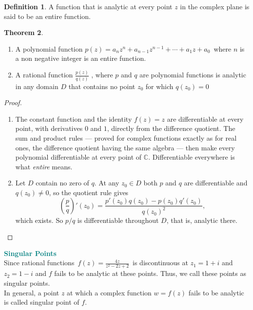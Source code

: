 \documentclass[11pt,a4paper]{article}
\theoremstyle{definition}
\newtheorem{thm}{Theorem}[section]
\newtheorem{definition}[thm]{Definition}
\begin{document}
\begin{definition}
A function that is analytic at every point $z$ in the complex plane is said to be an entire function.
\end{definition}

\begin{thm}
\begin{enumerate}
\item A polynomial function $p(z) = a_nz^n + a_{n - 1}z^{n - 1} + \cdots + a_1z + a_0\,$ where $n$ is a non negative integer is an entire function.
\item A rational function $\frac{p(z)}{q(z)}$ , where $p$ and $q$ are polynomial functions is analytic in any domain $D$ that contains no point $z_0$ for which $q(z_0) = 0$\\
\end{enumerate}

\begin{proof}
\begin{enumerate}
\item The constant function and the identity $f(z)=z$ are differentiable at
every point, with derivatives $0$ and $1$, directly from the difference
quotient. The sum and product rules --- proved for complex functions exactly as
for real ones, the difference quotient having the same algebra --- then make
every polynomial differentiable at every point of $\mathbb{C}$. Differentiable
everywhere is what \emph{entire} means.

\item Let $D$ contain no zero of $q$. At any $z_0\in D$ both $p$ and $q$ are
differentiable and $q(z_0)\neq 0$, so the quotient rule gives
$$\left(\frac{p}{q}\right)'(z_0)
=\frac{p'(z_0)q(z_0)-p(z_0)q'(z_0)}{q(z_0)^2},$$
which exists. So $p/q$ is differentiable throughout $D$, that is, analytic
there.
\end{enumerate}
\end{proof}
\end{thm}




\textbf{\textcolor{teal}{Singular Points}}\\
Since rational functions $\, f(z) = \frac{4z}{z^2 - 2z + 2}\,$ is discontinuous at $z_1 = 1 + i$ and $z_2 = 1 - i$ and $f$ fails to be analytic at these points. Thus, we call these points as singular points.\\
In general, a point $z$ at which a complex function $w = f(z)$ fails to be analytic is called singular point of $f$.\\
\end{document}
